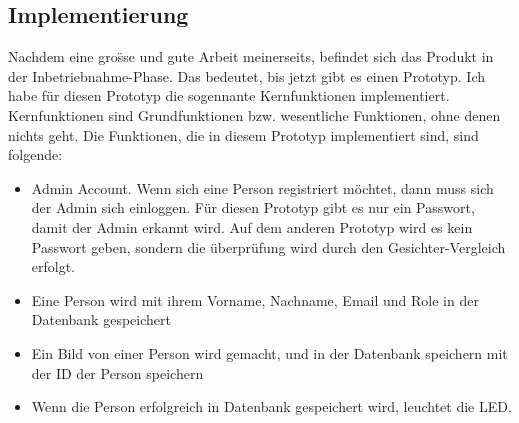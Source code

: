 \subsection{Implementierung}
Nachdem eine gro\"sse und gute Arbeit meinerseits, befindet sich das Produkt in der Inbetriebnahme-Phase. Das bedeutet, bis jetzt gibt es einen Prototyp. Ich habe f\"ur diesen Prototyp die sogennante Kernfunktionen implementiert. Kernfunktionen sind Grundfunktionen bzw. wesentliche Funktionen, ohne denen nichts geht. Die Funktionen, die in diesem Prototyp implementiert sind, sind folgende:
\begin{itemize}
	\item Admin Account. Wenn sich eine Person registriert m\"ochtet, dann muss sich der Admin sich einloggen. F\"ur diesen Prototyp gibt es nur ein Passwort, damit der Admin erkannt wird. Auf dem anderen Prototyp wird es kein Passwort geben, sondern die \"uberpr\"ufung wird durch den Gesichter-Vergleich erfolgt.
	\item Eine Person wird mit ihrem Vorname, Nachname, Email und Role in der Datenbank gespeichert
	\item Ein Bild von einer Person wird gemacht, und in der Datenbank speichern mit der ID der Person speichern
	\item Wenn die Person erfolgreich in Datenbank gespeichert wird, leuchtet die LED.
\end{itemize}
